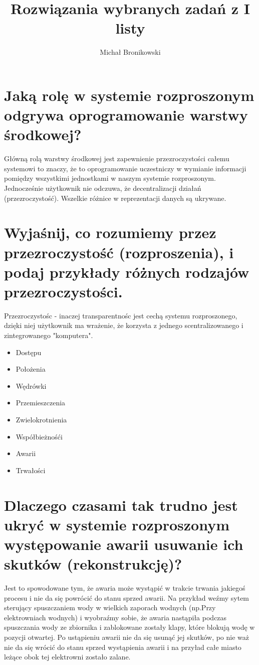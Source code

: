 \documentclass[10pt,a4paper]{article}
\author{Michał Bronikowski}
\title{Rozwiązania wybranych zadań z I listy}
\begin{document}
\maketitle
\newpage
\section{\normalsize{Jaką rolę w systemie rozproszonym odgrywa oprogramowanie warstwy środkowej?}}
Główną rolą warstwy środkowej jest zapewnienie przezroczystości całemu systemowi to znaczy, że
to oprogramowanie uczestniczy w wymianie informacji pomiędzy wszystkimi jednostkami w naszym systemie rozproszonym.
Jednocześnie użytkownik nie odczuwa, że decentralizacji działań (przezroczystość). Wszelkie różnice w reprezentacji danych są ukrywane.
\section{\normalsize{Wyjaśnij, co rozumiemy przez przezroczystość (rozproszenia), i podaj przykłady różnych rodzajów przezroczystości.}}
Przezroczystośc - inaczej transparentnośc jest cechą systemu rozproszonego, dzięki niej użytkownik ma wrażenie, że korzysta z jednego scentralizowanego i zintegrowanego "komputera".
\begin{itemize}
\item {Dostępu}
\item {Położenia}
\item {Wędrówki}
\item {Przemieszczenia}
\item {Zwielokrotnienia}
\item {Współbieżnośći}
\item {Awarii}
\item {Trwałości}
\end{itemize}
\section{\normalsize{Dlaczego czasami tak trudno jest ukryć w systemie rozproszonym występowanie awarii usuwanie ich skutków (rekonstrukcję)?}}
Jest to spowodowane tym, że awaria może wystąpić w trakcie trwania jakiegoś procesu i nie da się powrócić do stanu sprzed awarii.
Na przykład weźmy sytem sterujący spuszczaniem wody w wielkich zaporach wodnych (np.Przy elektrowniach wodnych) i wyobraźmy sobie, że awaria nastąpiła podczas spuszczania wody ze zbiornika i zablokowane zostały klapy, które blokują wodę w pozycji otwartej. Po ustąpieniu awarii nie da się usunąć jej skutków, po nie waż nie da się wrócić do stanu sprzed wystąpienia awarii i na przyład całe miasto leżące obok tej elektrowni zostało zalane.
\end{document}
